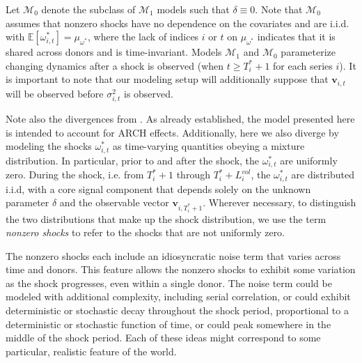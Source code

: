 \documentclass{uiucthesis2021}
\newcommand{\x}{\textbf{v}}
\def\mc#1{\mathcal{#1}} %
\def\E{\mathbb{E}} %
\def\mc#1{\mathcal{#1}}
\theoremstyle{definition}
\begin{document}
    Let $\mc{M}_{0}$ denote the subclass of $\mc{M}_{1}$ models such that $\delta \equiv 0$.  Note that $\mc{M}_{0}$ assumes that nonzero shocks have no dependence on the covariates and are i.i.d. with $\E[ \omega^{*}_{i,t}]=\mu_{\omega^{*}}$, where the lack of indices $i$ or $t$ on $\mu_{\omega^{*}}$ indicates that it is shared across donors and is time-invariant. Models $\mc{M}_{1}$ and $\mc{M}_{0}$ parameterize changing dynamics after a shock is observed (when $t \geq T_i^*+1$ for each series $i$). It is important to note that our modeling setup will additionally suppose that $\x_{i,t}$ will be observed before $\sigma_{i,t}^2$ is observed. 
    
Note also the divergences from \cite{lin2021minimizing}.  As already established, the model presented here is intended to account for ARCH effects.  Additionally, here we also diverge by modeling the shocks $\omega^{*}_{i,t}$ as time-varying quantities obeying a mixture distribution.  In particular, prior to and after the shock, the  $\omega^{*}_{i,t}$  are uniformly zero.  During the shock, i.e. from $T^{*}_{i}+1$ through $T^{*}_{i}+L^{vol}_{i}$, the $\omega^{*}_{i,t}$ are distributed i.i.d, with a core signal component that depends solely on the unknown parameter $\delta$ and the observable vector $\x_{i,T_{i}^{*}+1}$.  Wherever necessary, to distinguish the two distributions that make up the shock distribution, we use the term \textit{nonzero shocks} to refer to the shocks that are not uniformly zero.  

The nonzero shocks each include an idiosyncratic noise term that varies across time and donors.  This feature allows the nonzero shocks to exhibit some variation as the shock progresses, even within a single donor.  The noise term could be modeled with additional complexity, including serial correlation, or could exhibit deterministic or stochastic decay throughout the shock period, proportional to a deterministic or stochastic function of time, or could peak somewhere in the middle of the shock period.  Each of these ideas might correspond to some particular, realistic feature of the world.
\end{document}
